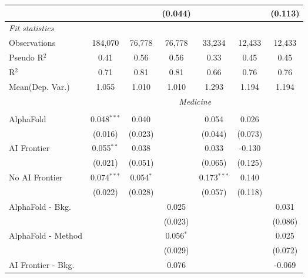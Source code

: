 \begin{tabular}{lcccccc}
                           &               &              & (0.044)      &               &         & (0.113)\\   
   \midrule
   \emph{Fit statistics}\\
   Observations            & 184,070       & 76,778       & 76,778       & 33,234        & 12,433  & 12,433\\  
   Pseudo R$^2$            & 0.41          & 0.56         & 0.56         & 0.33          & 0.45    & 0.45\\  
   R$^2$                   & 0.71          & 0.81         & 0.81         & 0.66          & 0.76    & 0.76\\  
   
Mean(Dep. Var.) & 1.055 & 1.010 & 1.010 & 1.293 & 1.194 & 1.194 \\
 & \multicolumn{6}{c}{\textit{Medicine}} \\ \\
   AlphaFold               & 0.048$^{***}$ & 0.040       &               & 0.054         & 0.026   &   \\   
                           & (0.016)       & (0.023)     &               & (0.044)       & (0.073) &   \\   
   AI Frontier             & 0.055$^{**}$  & 0.038       &               & 0.033         & -0.130  &   \\   
                           & (0.021)       & (0.051)     &               & (0.065)       & (0.125) &   \\   
   No AI Frontier          & 0.074$^{***}$ & 0.054$^{*}$ &               & 0.173$^{***}$ & 0.140   &   \\   
                           & (0.022)       & (0.028)     &               & (0.057)       & (0.118) &   \\   
   AlphaFold - Bkg.        &               &             & 0.025         &               &         & 0.031\\   
                           &               &             & (0.023)       &               &         & (0.086)\\   
   AlphaFold - Method      &               &             & 0.056$^{*}$   &               &         & 0.025\\   
                           &               &             & (0.029)       &               &         & (0.072)\\   
   AI Frontier - Bkg.      &               &             & 0.076         &               &         & -0.069\\   

\end{tabular}
